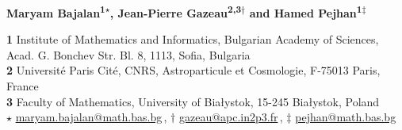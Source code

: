 \documentclass{SciPost}
\begin{document}
\pagestyle{SPstyle}

\begin{center}{\Large \textbf{\color{scipostdeepblue}{
Toward a Holographic Representation Theory\\of\\the Bosonic de Sitter Discrete Series
}}}\end{center}

\begin{center}\textbf{
    Maryam Bajalan\textsuperscript{1$\star$},
    Jean-Pierre Gazeau\textsuperscript{2,3$\dagger$} and
    Hamed Pejhan\textsuperscript{1$\ddagger$}
}\end{center}


\begin{center}
    {\bf 1} Institute of Mathematics and Informatics, Bulgarian Academy of Sciences, Acad. G. Bonchev Str. Bl. 8, 1113, Sofia, Bulgaria \\
    {\bf 2} Universit\'e Paris Cit\'e, CNRS, Astroparticule et Cosmologie, F-75013 Paris, France \\
    {\bf 3} Faculty of Mathematics, University of Bia\l ystok, 15-245 Bia\l ystok, Poland
    \\[\baselineskip]
    $\star$ \href{mailto:email1}{\small maryam.bajalan@math.bas.bg}\,,\quad
    $\dagger$ \href{mailto:email2}{\small gazeau@apc.in2p3.fr}\,,\quad
    $\ddagger$ \href{mailto:email2}{\small pejhan@math.bas.bg}
\end{center}
\end{document}
